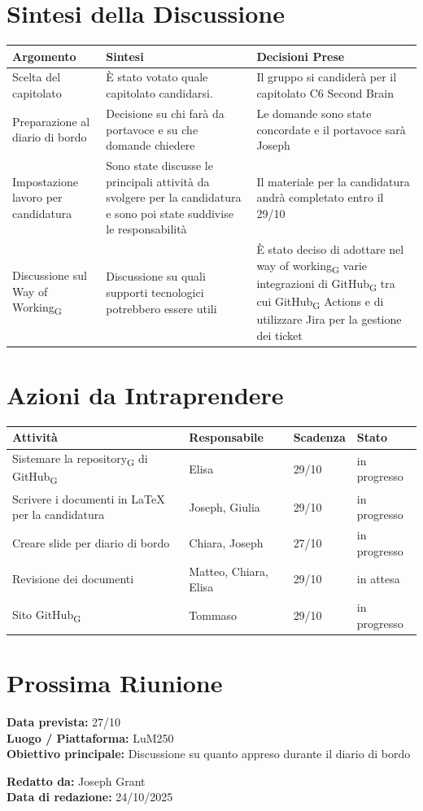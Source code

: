 \documentclass[a4paper,12pt]{article}
\newcommand{\gls}[1]{#1\textsubscript{G}}
\begin{document}
\section*{ Sintesi della Discussione}

\begin{longtable}{|p{}|p{}|p{}|}
\hline
\textbf{Argomento} & \textbf{Sintesi} & \textbf{Decisioni Prese} \\ \hline
 Scelta del capitolato&È stato votato quale capitolato candidarsi.  & Il gruppo si candiderà per il capitolato C6 Second Brain  \\ \hline
 Preparazione al diario di bordo&Decisione su chi farà da portavoce e su che domande chiedere  &Le domande sono state concordate e il portavoce sarà Joseph   \\ \hline
 Impostazione lavoro per candidatura&Sono state discusse le principali attività da svolgere per la candidatura e sono poi state suddivise le responsabilità  &Il materiale per la candidatura andrà completato entro il 29/10  \\ \hline
 Discussione sul \gls{Way of Working}&Discussione su quali supporti tecnologici potrebbero essere utili  &È stato deciso di adottare nel \gls{way of working} varie integrazioni di \gls{GitHub} tra cui \gls{GitHub} Actions e di utilizzare Jira per la gestione dei ticket \\ \hline
\end{longtable}


\section*{ Azioni da Intraprendere}

\begin{longtable}{|p{}|p{}|p{}|p{}|}
\hline
\textbf{Attività} & \textbf{Responsabile} & \textbf{Scadenza} & \textbf{Stato} \\ \hline
 Sistemare la \gls{repository} di \gls{GitHub}&Elisa  &29/10  &in progresso  \\ \hline
 Scrivere i documenti in LaTeX per la candidatura&Joseph, Giulia  &29/10  &in progresso  \\ \hline
 Creare slide per diario di bordo&Chiara, Joseph&27/10  &in progresso  \\ \hline
 Revisione dei documenti&Matteo, Chiara, Elisa  &29/10  &in attesa   \\ \hline
 Sito \gls{GitHub} &Tommaso&29/10  &in progresso   \\ \hline
\end{longtable}


\section*{ Prossima Riunione}
\textbf{Data prevista:} 27/10 \\
\textbf{Luogo / Piattaforma:} LuM250 \\
\textbf{Obiettivo principale:} Discussione su quanto appreso durante il diario di bordo


\textbf{Redatto da:} Joseph Grant \\
\textbf{Data di redazione:} 24/10/2025
\end{document}
